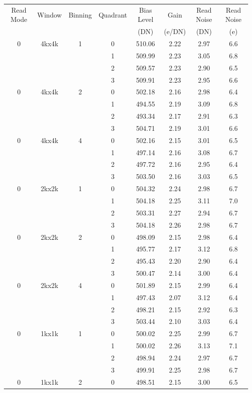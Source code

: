 \documentclass{article}
\newcommand{\code}[1]{{\ttfamily #1}}
\begin{document}
\begin{table}
\begin{center}\footnotesize
    \begin{tabular}{cccccccc}
    \hline
Read Mode&Window&Binning&Quadrant&Bias Level&Gain&Read Noise&Read Noise\\
&&&&(DN)&(e/DN)&(DN)&(e)\\
\hline
0&\code{4kx4k}&1
  &0& 510.06& 2.22& 2.97& 6.6\\
&&&1& 509.99& 2.23& 3.05& 6.8\\
&&&2& 509.57& 2.23& 2.90& 6.5\\
&&&3& 509.91& 2.23& 2.95& 6.6\\
0&\code{4kx4k}&2
  &0& 502.18& 2.16& 2.98& 6.4\\
&&&1& 494.55& 2.19& 3.09& 6.8\\
&&&2& 493.34& 2.17& 2.91& 6.3\\
&&&3& 504.71& 2.19& 3.01& 6.6\\
0&\code{4kx4k}&4
  &0& 502.16& 2.15& 3.01& 6.5\\
&&&1& 497.14& 2.16& 3.08& 6.7\\
&&&2& 497.72& 2.16& 2.95& 6.4\\
&&&3& 503.50& 2.16& 3.03& 6.5\\
\hline
0&\code{2kx2k}&1
  &0& 504.32& 2.24& 2.98& 6.7\\
&&&1& 504.18& 2.25& 3.11& 7.0\\
&&&2& 503.31& 2.27& 2.94& 6.7\\
&&&3& 504.18& 2.26& 2.98& 6.7\\
0&\code{2kx2k}&2
  &0& 498.09& 2.15& 2.98& 6.4\\
&&&1& 495.77& 2.17& 3.12& 6.8\\
&&&2& 495.43& 2.20& 2.90& 6.4\\
&&&3& 500.47& 2.14& 3.00& 6.4\\
0&\code{2kx2k}&4
  &0& 501.89& 2.15& 2.99& 6.4\\
&&&1& 497.43& 2.07& 3.12& 6.4\\
&&&2& 498.21& 2.15& 2.92& 6.3\\
&&&3& 503.44& 2.10& 3.03& 6.4\\
\hline
0&\code{1kx1k}&1
  &0& 500.02& 2.25& 2.99& 6.7\\
&&&1& 500.02& 2.26& 3.13& 7.1\\
&&&2& 498.94& 2.24& 2.97& 6.7\\
&&&3& 499.91& 2.25& 2.98& 6.7\\
0&\code{1kx1k}&2
  &0& 498.51& 2.15& 3.00& 6.5\\

\end{tabular}
\end{center}
\end{table}
\end{document}
